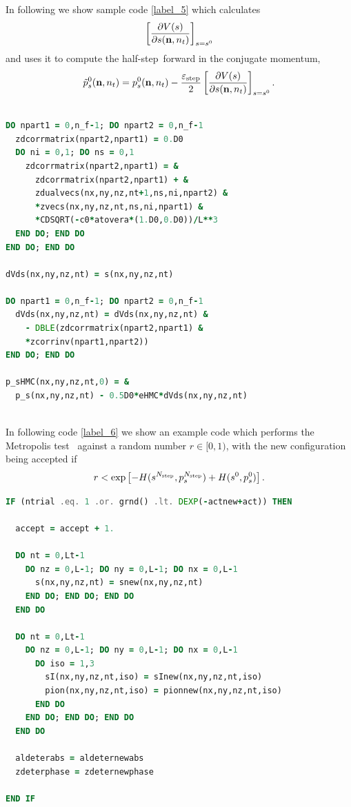 In following we show sample code \ref{label_5} which calculates 
\begin{equation}
\left[  \frac{\partial V(s)}{\partial s({\bf n},n_t%
)}\right]  _{s=s^{0}}
\end{equation}
and uses it to compute the
 half-step\ forward in the conjugate
momentum,
\begin{equation}
\tilde{p}_s^{0}({\bf n},n_t)=p_s^{0}({\bf n},n_t)-\frac{\varepsilon
_{\mathrm{step}}}{2}\left[  \frac{\partial V(s)}{\partial s({\bf n},n_t%
)}\right]  _{s=s^{0}}.
\end{equation}

\begin{lstlisting}[language=Fortran,caption=Sample code computing derivative with respect to the auxiliary field and half-step forward in the conjugate momentum.,label={label_5}]

DO npart1 = 0,n_f-1; DO npart2 = 0,n_f-1
  zdcorrmatrix(npart2,npart1) = 0.D0
  DO ni = 0,1; DO ns = 0,1
    zdcorrmatrix(npart2,npart1) = &
      zdcorrmatrix(npart2,npart1) + &
      zdualvecs(nx,ny,nz,nt+1,ns,ni,npart2) &
      *zvecs(nx,ny,nz,nt,ns,ni,npart1) &
      *CDSQRT(-c0*atovera*(1.D0,0.D0))/L**3
  END DO; END DO
END DO; END DO
           
dVds(nx,ny,nz,nt) = s(nx,ny,nz,nt) 

DO npart1 = 0,n_f-1; DO npart2 = 0,n_f-1
  dVds(nx,ny,nz,nt) = dVds(nx,ny,nz,nt) &
    - DBLE(zdcorrmatrix(npart2,npart1) &
    *zcorrinv(npart1,npart2))
END DO; END DO
                 
p_sHMC(nx,ny,nz,nt,0) = &
  p_s(nx,ny,nz,nt) - 0.5D0*eHMC*dVds(nx,ny,nz,nt)
  
\end{lstlisting}

In following code \ref{label_6} we show an example code which performs  the Metropolis test%
\ against a random number $r\in\lbrack0,1)$, with the new configuration being accepted if
\begin{equation}
r<\exp\left[  -H(s^{N_{\mathrm{step}}},p^{N_{\rm step }}_s)+H(s^{0}%
,p_s^{0})\right].
\end{equation}

\begin{lstlisting}[language=Fortran,caption=Sample code which performs  the Metropolis acceptance test,label={label_6}]
IF (ntrial .eq. 1 .or. grnd() .lt. DEXP(-actnew+act)) THEN

  accept = accept + 1.

  DO nt = 0,Lt-1
    DO nz = 0,L-1; DO ny = 0,L-1; DO nx = 0,L-1      
      s(nx,ny,nz,nt) = snew(nx,ny,nz,nt)
    END DO; END DO; END DO
  END DO
  
  DO nt = 0,Lt-1
    DO nz = 0,L-1; DO ny = 0,L-1; DO nx = 0,L-1      
      DO iso = 1,3
        sI(nx,ny,nz,nt,iso) = sInew(nx,ny,nz,nt,iso)
        pion(nx,ny,nz,nt,iso) = pionnew(nx,ny,nz,nt,iso)
      END DO
    END DO; END DO; END DO
  END DO
  
  aldeterabs = aldeternewabs
  zdeterphase = zdeternewphase
            
END IF
\end{lstlisting}

